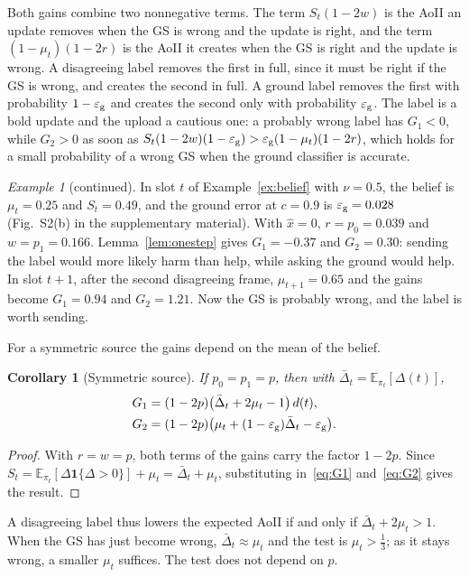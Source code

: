 \documentclass[10pt,journal,compsoc]{IEEEtran}
\newtheorem{corollary}{Corollary}
\theoremstyle{remark}
\newtheorem{example}{Example}
\newcommand{\E}{\mathbb{E}}
\newcommand{\ind}[1]{\mathbf{1}\{#1\}}
\newcommand{\Dbar}{\bar{\Delta}}
\newcommand{\ee}{\varepsilon}
\newcommand{\xh}{\hat{x}}
\begin{document}
Both gains combine two nonnegative terms. The term $S_t(1-2w)$ is the AoII an update removes when the GS is wrong and the update is right, and the term $(1-\mu_t)(1-2r)$ is the AoII it creates when the GS is right and the update is wrong. A disagreeing label removes the first in full, since it must be right if the GS is wrong, and creates the second in full. A ground label removes the first with probability $1-\ee_{\rm g}$ and creates the second only with probability $\ee_{\rm g}$. The label is a bold update and the upload a cautious one: a probably wrong label has $G_1<0$, while $G_2>0$ as soon as $S_t(1-2w)(1-\ee_{\rm g})>\ee_{\rm g}(1-\mu_t)(1-2r)$, which holds for a small probability of a wrong GS when the ground classifier is accurate.


\setcounter{example}{0}
\begin{example}[continued]
In slot $t$ of Example~\ref{ex:belief} with $\nu=0.5$, the belief is $\mu_t=0.25$ and $S_t=0.49$, and the ground error at $c=0.9$ is $\ee_{\rm g}=0.028$ (Fig.~S2(b) in the supplementary material). With $\xh=0$, $r=p_0=0.039$ and $w=p_1=0.166$. Lemma~\ref{lem:onestep} gives $G_1=-0.37$ and $G_2=0.30$: sending the label would more likely harm than help, while asking the ground would help. In slot $t+1$, after the second disagreeing frame, $\mu_{t+1}=0.65$ and the gains become $G_1=0.94$ and $G_2=1.21$. Now the GS is probably wrong, and the label is worth sending.
\end{example}

For a symmetric source the gains depend on the mean of the belief.

\begin{corollary}[Symmetric source]\label{cor:sym}
If $p_0=p_1=p$, then with $\Dbar_t=\E_{\pi_t}[\Delta(t)]$,
\begin{align*}
G_1&=(1-2p)\big(\Dbar_t+2\mu_t-1\big)\,d(t),\\
G_2&=(1-2p)\big(\mu_t+(1-\ee_{\rm g})\Dbar_t-\ee_{\rm g}\big).
\end{align*}
\end{corollary}
\begin{proof}
With $r=w=p$, both terms of the gains carry the factor $1-2p$. Since $S_t=\E_{\pi_t}[\Delta\ind{\Delta>0}]+\mu_t=\Dbar_t+\mu_t$, substituting in~\eqref{eq:G1} and~\eqref{eq:G2} gives the result.
\end{proof}

A disagreeing label thus lowers the expected AoII if and only if $\Dbar_t+2\mu_t>1$. When the GS has just become wrong, $\Dbar_t\approx\mu_t$ and the test is $\mu_t>\frac13$; as it stays wrong, a smaller $\mu_t$ suffices. The test does not depend on $p$.
\end{document}
